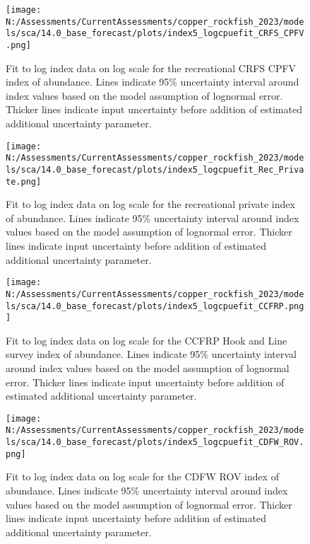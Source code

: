 \documentclass[11pt,
  english,
  letterpaper,
]{article}
\begin{document}
\pagebreak

\begin{figure}
\centering
\texttt{[image: N:/Assessments/CurrentAssessments/copper\_rockfish\_2023/models/sca/14.0\_base\_forecast/plots/index5\_logcpuefit\_CRFS\_CPFV.png]}
\caption{Fit to log index data on log scale for the recreational CRFS CPFV index of abundance. Lines indicate 95\% uncertainty interval around index values based on the model assumption of lognormal error. Thicker lines indicate input uncertainty before addition of estimated additional uncertainty parameter.\label{fig:crfs-cpfv-index-fit}}
\end{figure}

\pagebreak

\begin{figure}
\centering
\texttt{[image: N:/Assessments/CurrentAssessments/copper\_rockfish\_2023/models/sca/14.0\_base\_forecast/plots/index5\_logcpuefit\_Rec\_Private.png]}
\caption{Fit to log index data on log scale for the recreational private index of abundance. Lines indicate 95\% uncertainty interval around index values based on the model assumption of lognormal error. Thicker lines indicate input uncertainty before addition of estimated additional uncertainty parameter.\label{fig:crfs-pr-index-fit}}
\end{figure}

\pagebreak

\begin{figure}
\centering
\texttt{[image: N:/Assessments/CurrentAssessments/copper\_rockfish\_2023/models/sca/14.0\_base\_forecast/plots/index5\_logcpuefit\_CCFRP.png]}
\caption{Fit to log index data on log scale for the CCFRP Hook and Line survey index of abundance. Lines indicate 95\% uncertainty interval around index values based on the model assumption of lognormal error. Thicker lines indicate input uncertainty before addition of estimated additional uncertainty parameter.\label{fig:ccfrp-index-fit}}
\end{figure}

\pagebreak

\begin{figure}
\centering
\texttt{[image: N:/Assessments/CurrentAssessments/copper\_rockfish\_2023/models/sca/14.0\_base\_forecast/plots/index5\_logcpuefit\_CDFW\_ROV.png]}
\caption{Fit to log index data on log scale for the CDFW ROV index of abundance. Lines indicate 95\% uncertainty interval around index values based on the model assumption of lognormal error. Thicker lines indicate input uncertainty before addition of estimated additional uncertainty parameter.\label{fig:rov-index-fit}}
\end{figure}
\end{document}
